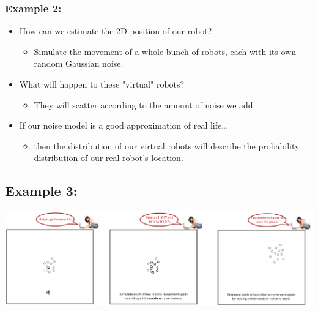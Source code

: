 \documentclass[10pt]{article}
\begin{document}
\subsubsection*{Example 2:}
\begin{itemize}
	\item How can we estimate the 2D position of our robot?
	\begin{itemize}
        \item Simulate the movement of a whole bunch of robots, each with its own random Gaussian noise.
    \end{itemize}
	\item What will happen to these "virtual" robots?
	\begin{itemize}
        \item They will scatter according to the amount of noise we add.
    \end{itemize}
	\item If our noise model is a good approximation of real life\dots
	\begin{itemize}
        \item then the distribution of our virtual robots will describe the probability distribution of our real robot's location.
    \end{itemize}
\end{itemize}

\subsection*{Example 3:}
\begin{center} 
	\includegraphics*[width=\textwidth]{L1_9.png} 
\end{center}
\end{document}
